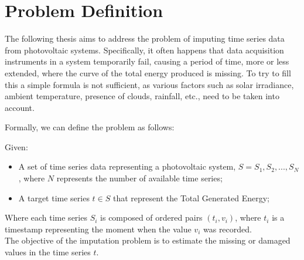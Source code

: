 \section{Problem Definition}
The following thesis aims to address the problem of imputing time series data from
photovoltaic systems. Specifically, it often happens that data acquisition
instruments in a system temporarily fail, causing a period of time, more or
less extended, where the curve of the total energy produced is missing.
To try to fill this  a simple formula is not sufficient,
as various factors such as solar irradiance, ambient temperature,
presence of clouds, rainfall, etc., need to be taken into account.

Formally, we can define the problem as follows:

\begin{definition}
	Given:
	\begin{itemize}
		\item A set of time series data representing a photovoltaic
		      system, $S = {S_1, S_2, ..., S_N}$, where $N$ represents
		      the number of available time series;
		\item A target time series $t \in S$ that represent the Total Generated Energy;
	\end{itemize}
	Where each time series $S_i$ is composed of ordered pairs $(t_i, v_i)$, where $t_i$ is
	a timestamp representing the moment when the value $v_i$ was recorded.\\
	The objective of the imputation problem is to estimate the missing or damaged values
	in the time series $t$.
\end{definition}

